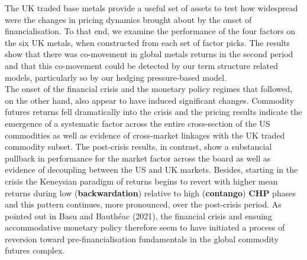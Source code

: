 \documentclass[]{elsarticle} %
\begin{document}
The UK traded base metals provide a useful set of assets to test how widespread were the changes in pricing dynamics brought about by the onset of financialisation. To that end, we examine the performance of the four factors on the six UK metals, when constructed from each set of factor picks. The results show that there was co-movement in global metals returns in the second period and that this co-movement could be detected by our term structure related models, particularly so by our hedging pressure-based model.\\
The onset of the financial crisis and the monetary policy regimes that followed, on the other hand, also appear to have induced significant changes. Commodity futures returns fell dramatically into the crisis and the pricing results indicate the emergence of a systematic factor across the entire cross-section of the US commodities as well as evidence of cross-market linkages with the UK traded commodity subset. The post-crisis results, in contrast, show a substancial pullback in performance for the market factor across the board as well as evidence of decoupling between the US and UK markets. Besides, starting in the crisis the Keneysian paradigm of returns begins to revert with higher mean returns during low (\textbf{backwardation}) relative to high (\textbf{contango}) \textbf{CHP} phases and this pattern continues, more pronounced, over the post-crisis period. As pointed out in Basu and Bauthéac (2021), the financial crisis and ensuing accommodative monetary policy therefore seem to have initiated a process of reversion toward pre-financialisation fundamentals in the global commodity futures complex.

\bigskip
\end{document}

